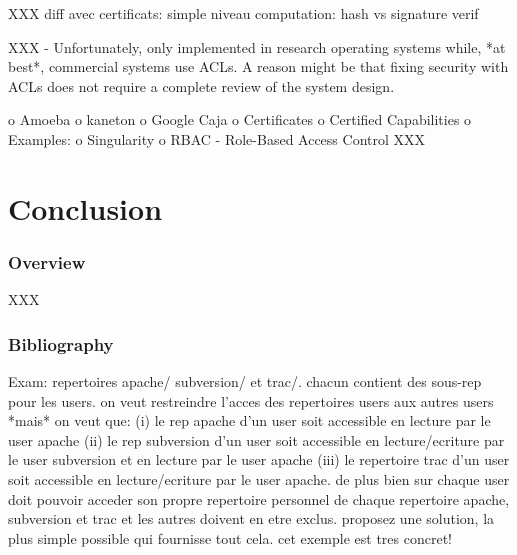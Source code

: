 XXX diff avec certificats: simple niveau computation: hash vs signature verif

XXX
    - Unfortunately, only implemented in research operating systems while, *at best*, commercial
      systems use ACLs. A reason might be that fixing security with ACLs does not require
      a complete review of the system design.

      o Amoeba
      o kaneton
      o Google Caja
  o Certificates
    o Certified Capabilities
    o Examples:
      o Singularity
  o RBAC - Role-Based Access Control
XXX

%
%

\section{Conclusion}


\begin{frame}
  \frametitle{Overview}

  XXX
\end{frame}

%
%

\begin{frame}
  \frametitle{Bibliography}

  
  
\end{frame}



Exam: repertoires apache/ subversion/ et trac/. chacun contient des sous-rep
  pour les users. on veut restreindre l'acces des repertoires users aux autres
  users *mais* on veut que: (i) le rep apache d'un user soit accessible
  en lecture par le user apache (ii) le rep subversion d'un user soit
  accessible en lecture/ecriture par le user subversion et en lecture par
  le user apache (iii) le repertoire trac d'un user soit accessible en
  lecture/ecriture par le user apache.
  de plus bien sur chaque user doit pouvoir acceder son propre repertoire
  personnel de chaque repertoire apache, subversion et trac et les autres
  doivent en etre exclus.
  proposez une solution, la plus simple possible qui fournisse tout cela.
  cet exemple est tres concret!

